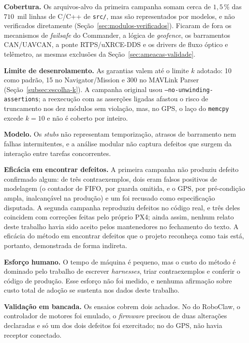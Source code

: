 \textbf{Cobertura.} Os arquivos-alvo da primeira campanha somam cerca de
$1{,}5\,\%$ das $710$~mil linhas de C/C++ de \texttt{src/}, mas são representados por
modelos, e não verificados diretamente (Seção~\ref{sec:modulos-verificados}). Ficaram de fora os
mecanismos de \textit{failsafe} do Commander, a lógica de \textit{geofence}, os
barramentos CAN/UAVCAN, a ponte RTPS/uXRCE-DDS e os drivers de fluxo óptico e
telêmetro, as mesmas exclusões da Seção~\ref{sec:ameacas-validade}.

\textbf{Limite de desenrolamento.} As garantias valem até o limite $k$
adotado: 10 como padrão, 15 no Navigator/Mission e 300 no MAVLink Parser
(Seção~\ref{subsec:escolha-k}). A campanha original usou
\texttt{--no-unwinding-assertions}; a reexecução com as asserções ligadas
afastou o risco de truncamento nos dez módulos sem violação, mas, no GPS, o
laço do \texttt{memcpy} excede $k = 10$ e não é coberto por inteiro.

\textbf{Modelo.} Os \textit{stubs} não representam temporização, atrasos de
barramento nem falhas intermitentes, e a análise modular não captura defeitos
que surgem da interação entre tarefas concorrentes.

\textbf{Eficácia em encontrar defeitos.} A primeira campanha não produziu
defeito confirmado algum: de três contraexemplos, dois eram falsos positivos de
modelagem (o contador de FIFO, por guarda omitida, e o GPS, por pré-condição ampla,
inalcançável na produção) e um foi recusado como especificação disputada. A segunda campanha reproduziu
defeitos no código real, e três deles coincidem com correções feitas pelo
próprio PX4; ainda assim, nenhum relato deste trabalho havia sido aceito pelos
mantenedores no fechamento do texto. A eficácia do método em encontrar defeitos
que o projeto reconheça como tais está, portanto, demonstrada de forma
indireta.

\textbf{Esforço humano.} O tempo de máquina é pequeno, mas o custo do método é
dominado pelo trabalho de escrever \textit{harnesses}, triar contraexemplos e
conferir o código de produção. Esse esforço não foi medido, e nenhuma afirmação
sobre custo total de adoção se sustenta nos dados deste trabalho.

\textbf{Validação em bancada.} Os ensaios cobrem dois achados. No do RoboClaw,
o controlador de motores foi emulado, o \textit{firmware} precisou de duas
alterações declaradas e só um dos dois defeitos foi exercitado; no do GPS, não
havia receptor conectado.


